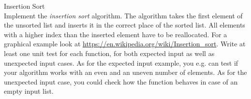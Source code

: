  Insertion Sort \\
Implement the \textit{insertion sort} algorithm.
The algorithm takes the first element of the unsorted list and inserts it in
the correct place of the sorted list.
All elements with a higher index than the inserted element have to be
reallocated.
For a graphical example look at
\url{https://en.wikipedia.org/wiki/Insertion\_sort}.
Write at least one unit test for each function, for both expected input as well as unexpected input cases. As for the expected input example, you e.g. can test if your algorithm works with an even and an uneven number of elements. As for the unexpected input case, you could check how the function behaves in case of an empty input list.

